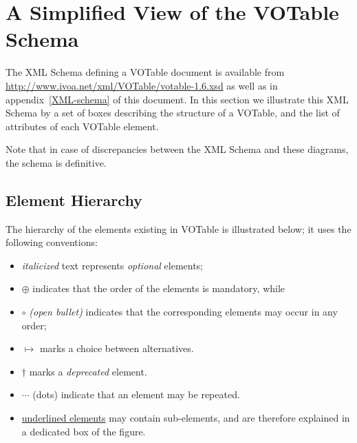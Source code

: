 \documentclass[11pt,a4paper]{ivoa}
\def\Arefx#1{appendix~\ref{#1}}
\def\order{$\oplus$ }
\def\unorder{{\large $\circ$ }}
\def\deprecated {$\dagger$ }
\def\choice{{$\mapsto$ }}
\begin{document}
\clearpage
\section{A Simplified View of the VOTable \ivoaDocversion{} Schema}
\label{dtd}

The XML Schema defining a VOTable \ivoaDocversion{} document
is available from
\url{http://www.ivoa.net/xml/VOTable/votable-1.6.xsd}
as well as in \Arefx{XML-schema} of this document.
In this section we illustrate this XML Schema
by a set of boxes describing the structure of a VOTable,
and the list of attributes of each VOTable element.

Note that in case of discrepancies between the XML Schema and
these diagrams, the schema is definitive.

\subsection{Element Hierarchy}

The hierarchy of the elements existing in VOTable \ivoaDocversion{} is illustrated below;
it uses the following conventions:
\begin{itemize}
\setlength\itemsep{0ex}
\item   {\em italicized} text represents {\em optional} elements;
\item   \order{} indicates that the order of the elements is mandatory, while
\item   \unorder{} {\em(open bullet)} indicates that the corresponding
        elements may occur in any order;
\item   \choice{} marks a choice between alternatives.
\item   \deprecated{} marks a {\em deprecated} element.
\item   $\cdots$ (dots) indicate that an element
        may be repeated.
\item   \underline{underlined elements} may contain sub-elements,
        and are therefore explained in a dedicated box of the figure.
\end{itemize}

\begin{quote}\small

\end{quote}
\end{document}
